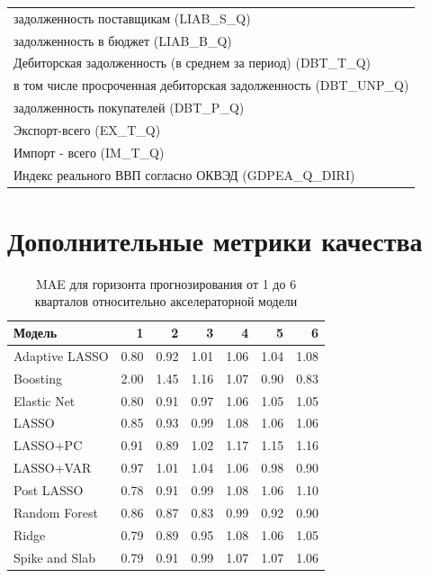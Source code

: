 \begin{appendices}
\begin{table}[ht]
\begin{tabular}{l}
  задолженность поставщикам  (LIAB\_S\_Q) \\ 
  задолженность в бюджет  (LIAB\_B\_Q) \\ 
  Дебиторская задолженность (в среднем за период)  (DBT\_T\_Q) \\ 
  в том числе просроченная дебиторская задолженность  (DBT\_UNP\_Q) \\ 
  задолженность покупателей  (DBT\_P\_Q) \\ 
  Экспорт-всего  (EX\_T\_Q) \\ 
  Импорт - всего  (IM\_T\_Q) \\ 
  Индекс реального ВВП согласно ОКВЭД  (GDPEA\_Q\_DIRI) \\ 
   \hline
\end{tabular}
\end{table}
\newpage


\chapter[]{Дополнительные метрики качества}\label{app:score}

\begin{table}[ht]
\centering
\caption{MAE для горизонта прогнозирования от 1 до 6 кварталов относительно акселераторной модели}
\begin{tabular}{lrrrrrr}
  \hline
Модель & 1 & 2 & 3 & 4 & 5 & 6 \\ 
  \hline
Adaptive LASSO & 0.80 & 0.92 & 1.01 & 1.06 & 1.04 & 1.08 \\ 
  Boosting & 2.00 & 1.45 & 1.16 & 1.07 & 0.90 & 0.83 \\ 
  Elastic Net & 0.80 & 0.91 & 0.97 & 1.06 & 1.05 & 1.05 \\ 
  LASSO & 0.85 & 0.93 & 0.99 & 1.08 & 1.06 & 1.06 \\ 
  LASSO+PC & 0.91 & 0.89 & 1.02 & 1.17 & 1.15 & 1.16 \\ 
  LASSO+VAR & 0.97 & 1.01 & 1.04 & 1.06 & 0.98 & 0.90 \\ 
  Post LASSO & 0.78 & 0.91 & 0.99 & 1.08 & 1.06 & 1.10 \\ 
  Random Forest & 0.86 & 0.87 & 0.83 & 0.99 & 0.92 & 0.90 \\ 
  Ridge & 0.79 & 0.89 & 0.95 & 1.08 & 1.06 & 1.05 \\ 
  Spike and Slab & 0.79 & 0.91 & 0.99 & 1.07 & 1.07 & 1.06 \\ 
   \hline
\end{tabular}
\end{table}



\end{appendices}
